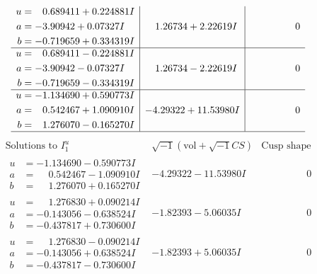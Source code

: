 \documentclass[1p]{elsarticle_modified}
\theoremstyle{definition}
\newcommand{\I}{\sqrt{-1}}
\begin{document}
$$\begin{array}{c|c|c}
\begin{aligned}
u &= \phantom{-}0.689411 + 0.224881 I \\
a &= -3.90942 + 0.07327 I \\
b &= -0.719659 + 0.334319 I\end{aligned}
 & \phantom{-}1.26734 + 2.22619 I & \phantom{-0.000000 } 0 \\ \hline\begin{aligned}
u &= \phantom{-}0.689411 - 0.224881 I \\
a &= -3.90942 - 0.07327 I \\
b &= -0.719659 - 0.334319 I\end{aligned}
 & \phantom{-}1.26734 - 2.22619 I & \phantom{-0.000000 } 0 \\ \hline\begin{aligned}
u &= -1.134690 + 0.590773 I \\
a &= \phantom{-}0.542467 + 1.090910 I \\
b &= \phantom{-}1.276070 - 0.165270 I\end{aligned}
 & -4.29322 + 11.53980 I & \phantom{-0.000000 } 0\\
 \hline 
 \end{array}$$\newpage$$\begin{array}{c|c|c}  
\text{Solutions to }I^u_{1}& \I (\text{vol} + \sqrt{-1}CS) & \text{Cusp shape}\\
 \hline 
\begin{aligned}
u &= -1.134690 - 0.590773 I \\
a &= \phantom{-}0.542467 - 1.090910 I \\
b &= \phantom{-}1.276070 + 0.165270 I\end{aligned}
 & -4.29322 - 11.53980 I & \phantom{-0.000000 } 0 \\ \hline\begin{aligned}
u &= \phantom{-}1.276830 + 0.090214 I \\
a &= -0.143056 - 0.638524 I \\
b &= -0.437817 + 0.730600 I\end{aligned}
 & -1.82393 - 5.06035 I & \phantom{-0.000000 } 0 \\ \hline\begin{aligned}
u &= \phantom{-}1.276830 - 0.090214 I \\
a &= -0.143056 + 0.638524 I \\
b &= -0.437817 - 0.730600 I\end{aligned}
 & -1.82393 + 5.06035 I & \phantom{-0.000000 } 0 \\ \hline\begin{aligned}

\end{aligned}
\end{array}$$
\end{document}
